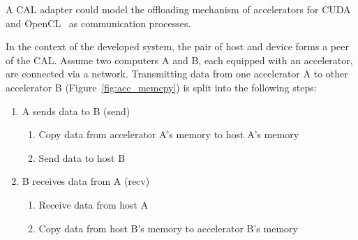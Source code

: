 A CAL adapter could model the offloading
mechanism of accelerators for CUDA~\cite{ref:cuda} and
OpenCL~\cite{ref:opencl} as communication processes.


 In the context of the
developed system, the pair of host and device forms a peer of the
CAL. Assume two computers A and B, each equipped with an accelerator, are
connected via a network. Transmitting data from one accelerator A to
other accelerator B (Figure~\ref{fig:acc_memcpy}) is split into the following steps:

\begin{enumerate}
\item A sends data to B (send)
  \begin{enumerate}
  \item Copy data from accelerator A's memory to host A's memory
  \item Send data to host B
  \end{enumerate}
\item B receives data from A (recv)
  \begin{enumerate}
  \item Receive data from host A
  \item Copy data from host B's memory to accelerator B's memory
  \end{enumerate}
\end{enumerate}

